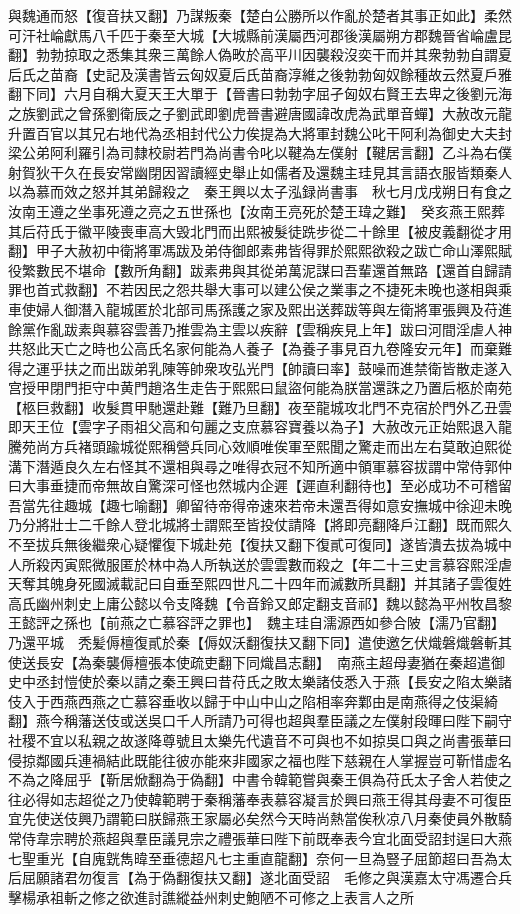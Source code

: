 與魏通而怒【復音扶又翻】乃謀叛秦【楚白公勝所以作亂於楚者其事正如此】柔然可汗社崘獻馬八千匹于秦至大城【大城縣前漢屬西河郡後漢屬朔方郡魏晉省崘盧昆翻】勃勃掠取之悉集其衆三萬餘人偽畋於高平川因襲殺沒奕干而并其衆勃勃自謂夏后氏之苗裔【史記及漢書皆云匈奴夏后氏苗裔淳維之後勃勃匈奴餘種故云然夏戶雅翻下同】六月自稱大夏天王大單于【晉書曰勃勃字屈孑匈奴右賢王去卑之後劉元海之族劉武之曾孫劉衛辰之子劉武即劉虎晉書避唐國諱改虎為武單音蟬】大赦改元龍升置百官以其兄右地代為丞相封代公力俟提為大將軍封魏公叱干阿利為御史大夫封梁公弟阿利羅引為司隸校尉若門為尚書令叱以鞬為左僕射【鞬居言翻】乙斗為右僕射賀狄干久在長安常幽閉因習讀經史舉止如儒者及還魏主珪見其言語衣服皆類秦人以為慕而效之怒并其弟歸殺之　秦王興以太子泓録尚書事　秋七月戊戌朔日有食之　汝南王遵之坐事死遵之亮之五世孫也【汝南王亮死於楚王瑋之難】　癸亥燕王熙葬其后苻氏于徽平陵喪車高大毁北門而出熙被髮徒跣步從二十餘里【被皮義翻從才用翻】甲子大赦初中衛將軍馮跋及弟侍御郎素弗皆得罪於熙熙欲殺之跋亡命山澤熙賦役繁數民不堪命【數所角翻】跋素弗與其從弟萬泥謀曰吾輩還首無路【還首自歸請罪也首式救翻】不若因民之怨共舉大事可以建公侯之業事之不捷死未晚也遂相與乘車使婦人御潛入龍城匿於北部司馬孫護之家及熙出送葬跋等與左衛將軍張興及苻進餘黨作亂跋素與慕容雲善乃推雲為主雲以疾辭【雲稱疾見上年】跋曰河間淫虐人神共怒此天亡之時也公高氏名家何能為人養子【為養子事見百九卷隆安元年】而棄難得之運乎扶之而出跋弟乳陳等帥衆攻弘光門【帥讀曰率】鼓噪而進禁衛皆散走遂入宫授甲閉門拒守中黄門趙洛生走告于熙熙曰鼠盜何能為朕當還誅之乃置后柩於南苑【柩巨救翻】收髮貫甲馳還赴難【難乃旦翻】夜至龍城攻北門不克宿於門外乙丑雲即天王位【雲字子雨祖父高和句麗之支庶慕容寶養以為子】大赦改元正始熙退入龍騰苑尚方兵褚頭踰城從熙稱營兵同心效順唯俟軍至熙聞之驚走而出左右莫敢迫熙從溝下潛遁良久左右怪其不還相與尋之唯得衣冠不知所適中領軍慕容拔謂中常侍郭仲曰大事垂捷而帝無故自驚深可怪也然城内企遲【遲直利翻待也】至必成功不可稽留吾當先往趣城【趣七喻翻】卿留待帝得帝速來若帝未還吾得如意安撫城中徐迎未晚乃分將壯士二千餘人登北城將士謂熙至皆投仗請降【將即亮翻降戶江翻】既而熙久不至拔兵無後繼衆心疑懼復下城赴苑【復扶又翻下復貳可復同】遂皆潰去拔為城中人所殺丙寅熙微服匿於林中為人所執送於雲雲數而殺之【年二十三史言慕容熙淫虐天奪其魄身死國滅載記曰自垂至熙四世凡二十四年而滅數所具翻】并其諸子雲復姓高氏幽州刺史上庸公懿以令支降魏【令音鈴又郎定翻支音祁】魏以懿為平州牧昌黎王懿評之孫也【前燕之亡慕容評之罪也】　魏主珪自濡源西如參合陂【濡乃官翻】乃還平城　秃髪傉檀復貳於秦【傉奴沃翻復扶又翻下同】遣使邀乞伏熾磐熾磐斬其使送長安【為秦襲傉檀張本使疏吏翻下同熾昌志翻】　南燕主超母妻猶在秦超遣御史中丞封愷使於秦以請之秦王興曰昔苻氏之敗太樂諸伎悉入于燕【長安之陷太樂諸伎入于西燕西燕之亡慕容垂收以歸于中山中山之陷相率奔鄴由是南燕得之伎渠綺翻】燕今稱藩送伎或送吳口千人所請乃可得也超與羣臣議之左僕射段暉曰陛下嗣守社稷不宜以私親之故遂降尊號且太樂先代遺音不可與也不如掠吳口與之尚書張華曰侵掠鄰國兵連禍結此既能往彼亦能來非國家之福也陛下慈親在人掌握豈可靳惜虚名不為之降屈乎【靳居焮翻為于偽翻】中書令韓範嘗與秦王俱為苻氏太子舍人若使之往必得如志超從之乃使韓範聘于秦稱藩奉表慕容凝言於興曰燕王得其母妻不可復臣宜先使送伎興乃謂範曰朕歸燕王家屬必矣然今天時尚熱當俟秋凉八月秦使員外散騎常侍韋宗聘於燕超與羣臣議見宗之禮張華曰陛下前既奉表今宜北面受詔封逞曰大燕七聖重光【自廆皝雋暐至垂德超凡七主重直龍翻】奈何一旦為豎子屈節超曰吾為太后屈願諸君勿復言【為于偽翻復扶又翻】遂北面受詔　毛修之與漢嘉太守馮遷合兵擊楊承祖斬之修之欲進討譙縱益州刺史鮑陋不可修之上表言人之所